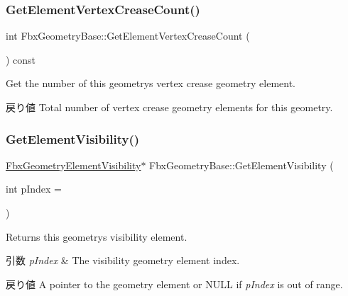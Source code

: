 \subsubsection{\texorpdfstring{Get\+Element\+Vertex\+Crease\+Count()}{GetElementVertexCreaseCount()}}
{\footnotesize\ttfamily int Fbx\+Geometry\+Base\+::\+Get\+Element\+Vertex\+Crease\+Count (\begin{DoxyParamCaption}{ }\end{DoxyParamCaption}) const}

Get the number of this geometry\textquotesingle{}s vertex crease geometry element. \begin{DoxyReturn}{戻り値}
Total number of vertex crease geometry elements for this geometry. 
\end{DoxyReturn}
\mbox{\label{class_fbx_geometry_base_ad4efa742959f1ff9db49f67cebcc5779}} 
\subsubsection{\texorpdfstring{Get\+Element\+Visibility()}{GetElementVisibility()}\hspace{0.1cm}{\footnotesize\ttfamily [1/2]}}
{\footnotesize\ttfamily \hyperlink{fbxlayer_8h_a98f6c16a3021e9e04b0352f652eac2a1}{Fbx\+Geometry\+Element\+Visibility}$\ast$ Fbx\+Geometry\+Base\+::\+Get\+Element\+Visibility (\begin{DoxyParamCaption}\item[{int}]{p\+Index = {} }\end{DoxyParamCaption})}

Returns this geometry\textquotesingle{}s visibility element. 
\begin{DoxyParams}{引数}
{\em p\+Index} & The visibility geometry element index. \\
\hline
\end{DoxyParams}
\begin{DoxyReturn}{戻り値}
A pointer to the geometry element or {\ttfamily N\+U\+LL} if {\itshape p\+Index} is out of range. 
\end{DoxyReturn}
\mbox{\label{class_fbx_geometry_base_a7354e0200f75665cbc4f3137cac53046}} 
